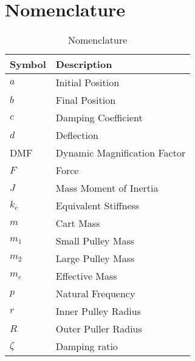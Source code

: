 \section{Nomenclature}  






\begin{table}[H]
    \centering
    \caption{Nomenclature}
    \label{tab:nomenclature}
    \begin{tabular}{ll}
        \toprule
        Symbol & Description \\
        \midrule
        $a$ & Initial Position \\
        $b$ & Final Position \\
        $c$ & Damping Coefficient \\
        $d$ & Deflection \\
        DMF & Dynamic Magnification Factor \\
        $F$ & Force \\
        $J$ & Mass Moment of Inertia \\
        $k_e$ & Equivalent Stiffness \\
        $m$ & Cart Mass \\
        $m_1$ & Small Pulley Mass \\
        $m_2$ & Large Pulley Mass \\
        $m_e$ & Effective Mass \\
        $p$ & Natural Frequency \\
        $r$ & Inner Pulley Radius \\
        $R$ & Outer Puller Radius \\
        $\zeta$ & Damping ratio \\
        \bottomrule
    \end{tabular}
\end{table}